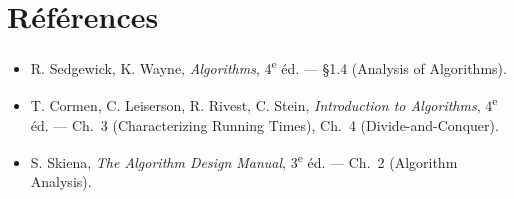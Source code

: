 \documentclass[11pt,a4paper]{article}
\theoremstyle{definition}
\theoremstyle{remark}
\begin{document}
\section*{Références}

\begin{itemize}[nosep]
    \item R. Sedgewick, K. Wayne, \emph{Algorithms}, 4\textsuperscript{e} éd.
          --- §1.4 (Analysis of Algorithms).
    \item T. Cormen, C. Leiserson, R. Rivest, C. Stein,
          \emph{Introduction to Algorithms}, 4\textsuperscript{e} éd.
          --- Ch.~3 (Characterizing Running Times), Ch.~4
          (Divide-and-Conquer).
    \item S. Skiena, \emph{The Algorithm Design Manual},
          3\textsuperscript{e} éd. --- Ch.~2 (Algorithm Analysis).
\end{itemize}
\end{document}
